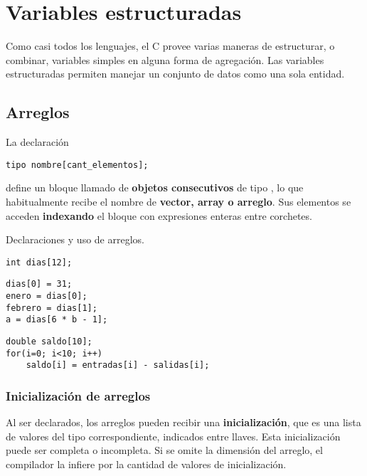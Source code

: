 


\chapter{Variables estructuradas}
\label{sec:tc-estructuradas}
Como casi todos los lenguajes, el C provee varias maneras de estructurar, o combinar, variables simples en
alguna forma de agregación. Las variables estructuradas permiten manejar un conjunto de datos como una sola entidad.

\section{Arreglos}
La declaración
\begin{lstlisting}
tipo nombre[cant_elementos];
\end{lstlisting}

define un bloque llamado  de  \textbf{objetos consecutivos} de tipo
, lo que habitualmente recibe el nombre de \textbf{vector, array o arreglo}. Sus
elementos se acceden \textbf{indexando} el bloque con expresiones enteras entre
corchetes.

\begin{ejemplo}
Declaraciones y uso de arreglos.
\begin{lstlisting}
int dias[12];
\end{lstlisting}
\begin{lstlisting}
dias[0] = 31;
enero = dias[0];
febrero = dias[1];
a = dias[6 * b - 1];
\end{lstlisting}
\begin{lstlisting}
double saldo[10];
for(i=0; i<10; i++)
    saldo[i] = entradas[i] - salidas[i];
\end{lstlisting}
\end{ejemplo}



\subsection{Inicialización de arreglos}

Al ser declarados, los arreglos pueden recibir una \textbf{inicialización}, que es una
lista de valores del tipo correspondiente, indicados entre llaves. Esta
inicialización puede ser completa o incompleta. Si se omite la dimensión del
arreglo, el compilador la infiere por la cantidad de valores de inicialización.

